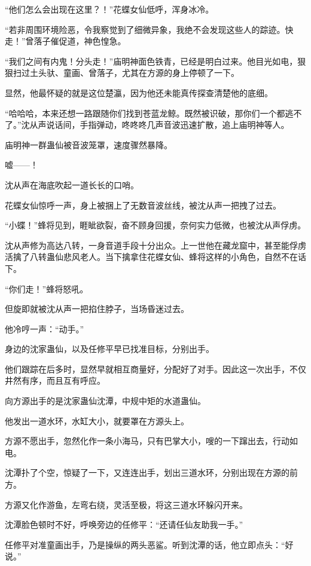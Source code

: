 
\begin{this_body}

“他们怎么会出现在这里？！”花蝶女仙低呼，浑身冰冷。

“若非周围环境险恶，令我察觉到了细微异象，我绝不会发现这些人的踪迹。快走！”曾落子催促道，神色惶急。

“我们之间有内鬼！分头走！”庙明神面色铁青，已经是明白过来。他目光如电，狠狠扫过土头驮、童画、曾落子，尤其在方源的身上停顿了一下。

显然，他最怀疑的就是这位楚瀛，因为他还未能真传探查清楚他的底细。

“哈哈哈，本来还想一路跟随你们找到苍蓝龙鲸。既然被识破，那你们一个都逃不了。”沈从声说话间，手指弹动，咚咚咚几声音波迅速扩散，追上庙明神等人。

庙明神一群蛊仙被音波笼罩，速度骤然暴降。

嘘——！

沈从声在海底吹起一道长长的口哨。

花蝶女仙惊呼一声，身上被捆上了无数音波丝线，被沈从声一把拽了过去。

“小蝶！”蜂将见到，睚眦欲裂，奋不顾身回援，奈何实力低微，也被沈从声俘虏。

沈从声修为高达八转，一身音道手段十分出众。上一世他在藏龙窟中，甚至能俘虏活擒了八转蛊仙悲风老人。当下擒拿住花蝶女仙、蜂将这样的小角色，自然不在话下。

“你们走！”蜂将怒吼。

但旋即就被沈从声一把掐住脖子，当场昏迷过去。

他冷哼一声：“动手。”

身边的沈家蛊仙，以及任修平早已找准目标，分别出手。

他们跟踪在后多时，显然早就相互商量好，分配好了对手。因此这一次出手，不仅井然有序，而且互有呼应。

向方源出手的是沈家蛊仙沈潭，中规中矩的水道蛊仙。

他发出一道水环，水缸大小，就要罩在方源头上。

方源不愿出手，忽然化作一条小海马，只有巴掌大小，嗖的一下蹿出去，行动如电。

沈潭扑了个空，惊疑了一下，又连连出手，划出三道水环，分别出现在方源的前方。

方源又化作游鱼，左弯右绕，灵活至极，将这三道水环躲闪开来。

沈潭脸色顿时不好，呼唤旁边的任修平：“还请任仙友助我一手。”

任修平对准童画出手，乃是操纵的两头恶鲨。听到沈潭的话，他立即点头：“好说。”


\end{this_body}

